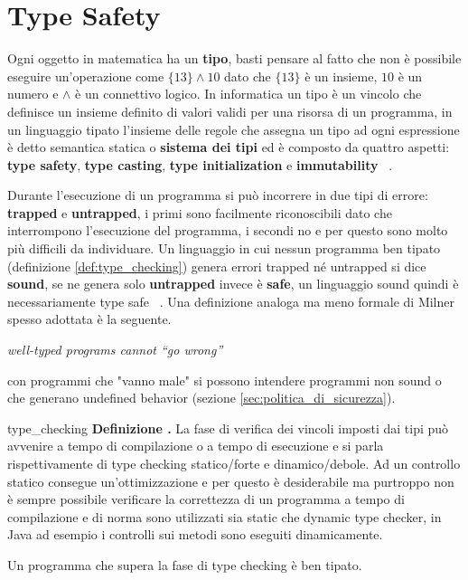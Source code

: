 \documentclass[Lau,binding=0.6cm]{sapthesis}
\newenvironment{myDefinition}[2]{ \begin{Definizione}[adjusted title=#1]{}{#2}
    \textbf{Definizione \thetcbcounter.} }{\end{Definizione}}
\begin{document}




\chapter{Type Safety} \label{chap:type_safety}
Ogni oggetto in matematica ha un \textbf{tipo}, basti pensare al fatto che non è possibile eseguire un'operazione come $ \{13\} \land 10 $ dato che $\{13\}$ è un insieme, $10$ è un numero e $\land$ è un connettivo logico. 
In informatica un tipo è un vincolo che definisce un insieme definito di valori validi per una risorsa di un programma, in un linguaggio tipato l'insieme delle regole che assegna un tipo ad ogni espressione è detto semantica statica o \textbf{sistema dei tipi} ed è composto da quattro aspetti: \textbf{type safety}, \textbf{type casting}, \textbf{type initialization} e \textbf{immutability} ~\cite{security_framework}.

Durante l'esecuzione di un programma si può incorrere in due tipi di errore: \textbf{trapped} e \textbf{untrapped}, i primi sono facilmente riconoscibili dato che interrompono l'esecuzione del programma, i secondi no e per questo sono molto più difficili da individuare. Un linguaggio in cui nessun programma ben tipato (definizione \ref{def:type_checking}) genera errori trapped né untrapped si dice \textbf{sound}, se ne genera solo \textbf{untrapped} invece è \textbf{safe}, un linguaggio sound quindi è necessariamente type safe ~\cite{cencia:dispense}. Una definizione analoga ma meno formale di Milner spesso adottata è la seguente. 

\begin{center}
   \textit{well-typed programs cannot “go wrong”} ~\cite{milner:type_polymorphism}
\end{center}

con programmi che "vanno male" si possono intendere programmi non sound o che generano undefined behavior (sezione \ref{sec:politica_di_sicurezza}).

\begin{myDefinition}{Type checking}{type_checking}
    La fase di verifica dei vincoli imposti dai tipi può avvenire a tempo di compilazione o a tempo di esecuzione e si parla rispettivamente di type checking statico/forte e dinamico/debole. Ad un controllo statico consegue un'ottimizzazione e per questo è desiderabile ma purtroppo non è sempre possibile verificare la correttezza di un programma a tempo di compilazione e di norma sono utilizzati sia static che dynamic type checker, in Java ad esempio i controlli sui metodi sono eseguiti dinamicamente.

    Un programma che supera la fase di type checking è ben tipato.     
\end{myDefinition}
 
\end{document}
